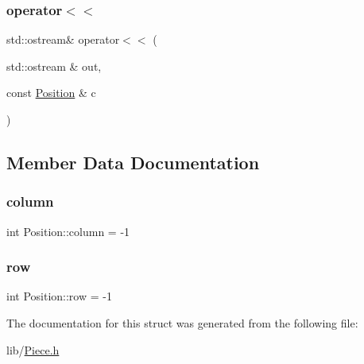 \subsubsection{\texorpdfstring{operator$<$$<$}{operator<<}}
{\footnotesize\ttfamily std\+::ostream\& operator$<$$<$ (\begin{DoxyParamCaption}\item[{std\+::ostream \&}]{out,  }\item[{const \hyperlink{struct_position}{Position} \&}]{c }\end{DoxyParamCaption})\hspace{0.3cm}{\ttfamily [friend]}}



\subsection{Member Data Documentation}
\mbox{\label{struct_position_a7bf46f67257b7fd5d6ced23095d15846}} 
\subsubsection{\texorpdfstring{column}{column}}
{\footnotesize\ttfamily int Position\+::column = -\/1}

\mbox{\label{struct_position_a224d714110152e1fca26b2437253f56a}} 
\subsubsection{\texorpdfstring{row}{row}}
{\footnotesize\ttfamily int Position\+::row = -\/1}



The documentation for this struct was generated from the following file\+:\begin{DoxyCompactItemize}
\item 
lib/\hyperlink{_piece_8h}{Piece.\+h}\end{DoxyCompactItemize}
